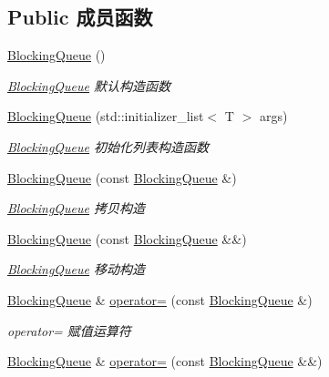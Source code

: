 \subsection*{Public 成员函数}
\begin{DoxyCompactItemize}
\item 
\mbox{\label{classBlockingQueue_a42f821a61ba22ba27e6d1a434ab27eb2}} 
\hyperlink{classBlockingQueue_a42f821a61ba22ba27e6d1a434ab27eb2}{Blocking\+Queue} ()
\begin{DoxyCompactList}\small\item\em \hyperlink{classBlockingQueue}{Blocking\+Queue} 默认构造函数 \end{DoxyCompactList}\item 
\hyperlink{classBlockingQueue_a4d1bbabd0a1212ab77b3a24614b6b0c1}{Blocking\+Queue} (std\+::initializer\+\_\+list$<$ T $>$ args)
\begin{DoxyCompactList}\small\item\em \hyperlink{classBlockingQueue}{Blocking\+Queue} 初始化列表构造函数 \end{DoxyCompactList}\item 
\hyperlink{classBlockingQueue_a2f2b1e4d887d77a81fddabd44c5cdbfd}{Blocking\+Queue} (const \hyperlink{classBlockingQueue}{Blocking\+Queue} \&)
\begin{DoxyCompactList}\small\item\em \hyperlink{classBlockingQueue}{Blocking\+Queue} 拷贝构造 \end{DoxyCompactList}\item 
\hyperlink{classBlockingQueue_ab7dbc308989dda7bef2f884a2703c806}{Blocking\+Queue} (const \hyperlink{classBlockingQueue}{Blocking\+Queue} \&\&)
\begin{DoxyCompactList}\small\item\em \hyperlink{classBlockingQueue}{Blocking\+Queue} 移动构造 \end{DoxyCompactList}\item 
\hyperlink{classBlockingQueue}{Blocking\+Queue} \& \hyperlink{classBlockingQueue_aaee07bb9044a01b4cb0af75748795325}{operator=} (const \hyperlink{classBlockingQueue}{Blocking\+Queue} \&)
\begin{DoxyCompactList}\small\item\em operator= 赋值运算符 \end{DoxyCompactList}\item 
\hyperlink{classBlockingQueue}{Blocking\+Queue} \& \hyperlink{classBlockingQueue_abbe4440d6ed06d175925bba1f3c02312}{operator=} (const \hyperlink{classBlockingQueue}{Blocking\+Queue} \&\&)

\end{DoxyCompactItemize}
